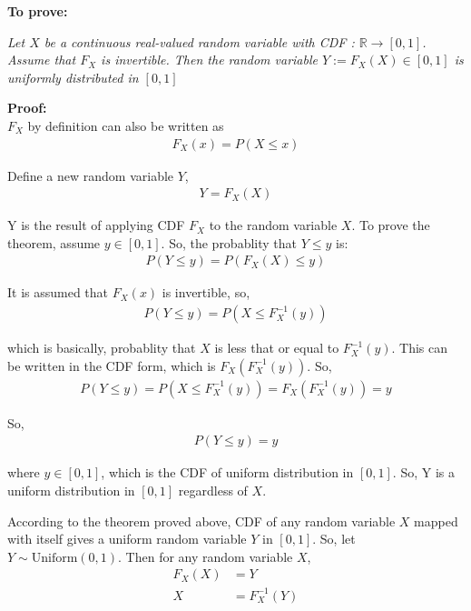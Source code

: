 \begin{solution}



	\textbf{To prove: }

	\emph{Let $X$ be a continuous real-valued random variable with CDF  : $\mathbb{R} \rightarrow [0, 1]$. Assume that
		$F_X$ is invertible. Then the random variable $Y := F_X (X) \in [0, 1]$ is uniformly distributed in $[0, 1]$}

	\textbf{Proof:}\\
	$F_X$ by definition can also be written as
	\begin{align}
		F_X(x) = P(X\leq x)
	\end{align}

	Define a new random variable $Y$,
	\begin{align}
		Y =F_X(X)
	\end{align}

	Y is the result of applying CDF $F_X$ to the random variable $X$. To
	prove the theorem, assume $y\in [0,1]$. So, the probablity that $Y \leq
		y$ is:
	\begin{align}
		P(Y\leq y) = P(F_X(X)\leq y)
	\end{align}

	It is assumed that $F_X(x)$ is invertible, so,
	\begin{align}
		P(Y\leq y) = P(X\leq F_X^{-1}(y))
	\end{align}

	which is basically, probablity that $X$ is less that or equal to $F_X^{-1}(y)$. This can be written in the CDF form, which is $F_X(F_X^{-1}(y))$. So,
	\begin{align}
		P(Y\leq y) = P(X\leq F_X^{-1}(y)) = F_X(F_X^{-1}(y)) = y
	\end{align}

	So,
	\begin{align}
		P(Y\leq y) = y
	\end{align}

	where $y\in [0,1]$, which is the CDF of uniform distribution in $[0,1]$.
	So, Y is a uniform distribution in $[0,1]$ regardless of $X$.


	According to the theorem proved above, CDF of any random variable $X$
	mapped with itself gives a uniform random variable $Y$ in $[0,1]$. So,
	let $Y\sim \text{Uniform}(0,1)$. Then for any random variable $X$,
	\begin{align}
		F_X(X) & = Y           \\
		X      & = F_X^{-1}(Y)
	\end{align}


\end{solution}
